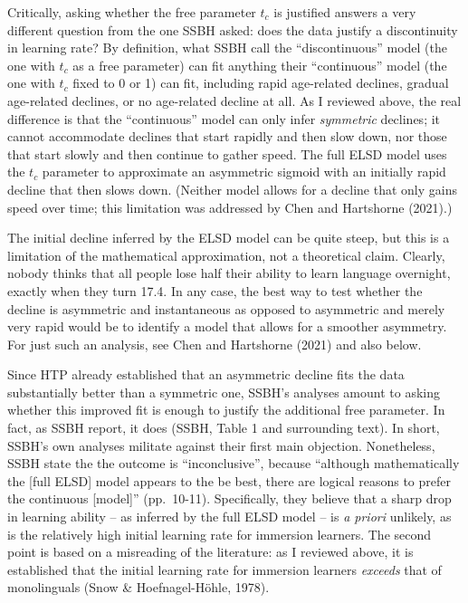 \documentclass[
  english,
  doc,floatsintext]{apa6}
\begin{document}
Critically, asking whether the free parameter \(t_c\) is justified answers a very different question from the one SSBH asked: does the data justify a discontinuity in learning rate? By definition, what SSBH call the ``discontinuous'' model (the one with \(t_c\) as a free parameter) can fit anything their ``continuous'' model (the one with \(t_c\) fixed to 0 or 1) can fit, including rapid age-related declines, gradual age-related declines, or no age-related decline at all. As I reviewed above, the real difference is that the ``continuous'' model can only infer \emph{symmetric} declines; it cannot accommodate declines that start rapidly and then slow down, nor those that start slowly and then continue to gather speed. The full ELSD model uses the \(t_c\) parameter to approximate an asymmetric sigmoid with an initially rapid decline that then slows down. (Neither model allows for a decline that only gains speed over time; this limitation was addressed by Chen and Hartshorne (2021).)

The initial decline inferred by the ELSD model can be quite steep, but this is a limitation of the mathematical approximation, not a theoretical claim. Clearly, nobody thinks that all people lose half their ability to learn language overnight, exactly when they turn 17.4. In any case, the best way to test whether the decline is asymmetric and instantaneous as opposed to asymmetric and merely very rapid would be to identify a model that allows for a smoother asymmetry. For just such an analysis, see Chen and Hartshorne (2021) and also below.

Since HTP already established that an asymmetric decline fits the data substantially better than a symmetric one, SSBH's analyses amount to asking whether this improved fit is enough to justify the additional free parameter. In fact, as SSBH report, it does (SSBH, Table 1 and surrounding text). In short, SSBH's own analyses militate against their first main objection. Nonetheless, SSBH state the the outcome is ``inconclusive'', because ``although mathematically the {[}full ELSD{]} model appears to the be best, there are logical reasons to prefer the continuous {[}model{]}'' (pp.~10-11). Specifically, they believe that a sharp drop in learning ability -- as inferred by the full ELSD model -- is \emph{a priori} unlikely, as is the relatively high initial learning rate for immersion learners. The second point is based on a misreading of the literature: as I reviewed above, it is established that the initial learning rate for immersion learners \emph{exceeds} that of monolinguals (Snow \& Hoefnagel-Höhle, 1978).
\end{document}
